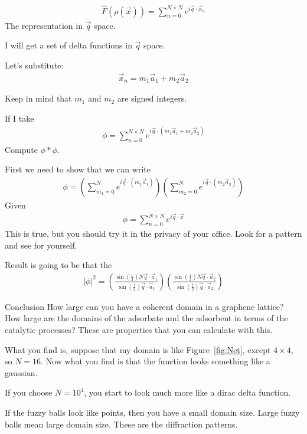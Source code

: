 \documentclass{article}
\newcommand{\norm}[1]{\left|#1\right|}
\newcommand{\xsubn}[0]{\vec{x}_n}
\newcommand{\xvec}[0]{\vec{x}}
\newcommand{\qvec}[0]{\vec{q}}
\newcommand{\aOne}[0]{\vec{a}_1}
\newcommand{\aTwo}[0]{\vec{a}_2}
\begin{document}
\begin{section}{}
	\begin{align*}
		\hat{F}(\rho(\xvec)) = \sum_{n=0}^{N\times N}e^{i\vec{q}\cdot\xsubn}
	\end{align*}
	The representation in $\qvec$ space.

	I will get a set of delta functions in $\qvec$ space.

	Let's substitute:
	\begin{align*}
		\xsubn = m_1\aOne + m_2\aTwo
	\end{align*}

	Keep in mind that $m_1$ and $m_2$ are signed integers.

	If I take 
	\begin{align*}
		\phi = \sum_{n=0}^{N\times N}e^{i\qvec\cdot (m_1\aOne + m_2\aTwo)}
	\end{align*}
	Compute $\phi\ast \phi$. 

	First we need to show that we can write
	\begin{align*}
		\phi = \left(\sum_{m_1 = 0}^{N}e^{i\qvec\cdot(m_1\aOne)}\right)\left(\sum_{m_2 = 0}^{N}e^{i\qvec\cdot(m_2\aTwo)}\right)
	\end{align*}
	Given 
	\begin{align*}
		\phi = \sum_{n=0}^{N\times N}e^{i\qvec\cdot\xvec}
	\end{align*} 
This is true, but you should try it in the privacy of your office. Look for a pattern and see for yourself.

Result is going to be that the 
\begin{align*}
	\norm{\phi}^2 = \left(\frac{\sin{(\frac{1}{2})}N\qvec\cdot\aOne}{\sin{(\frac{1}{2})}\qvec\cdot\aOne}\right)\left(\frac{\sin{(\frac{1}{2})}N\qvec\cdot\aTwo}{\sin{(\frac{1}{2})}\qvec\cdot\aTwo}\right)
\end{align*}
\end{section}
\begin{section}{Conclusion}
	How large can you have a coherent domain in a graphene lattice? How large are the domains of the adsorbate and the adsorbent in terms of the catalytic processes? These are properties that you can calculate with this.

	What you find is, suppose that my domain is like Figure~\ref{fig:Net}, except $4\times 4$, so $N=16$. Now what you find is that the function looks something like a gaussian.

	If you choose $N=10^4$, you start to look much more like a dirac delta function.

	If the fuzzy balls look like points, then you have a small domain size. Large fuzzy balls mean large domain size. These are the diffraction patterns.
\end{section}
\end{document}
